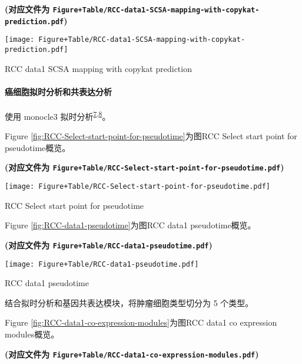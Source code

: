 \documentclass[
]{article}
\begin{document}
\textbf{(对应文件为 \texttt{Figure+Table/RCC-data1-SCSA-mapping-with-copykat-prediction.pdf})}

\def\@captype{figure}
\begin{center}
\texttt{[image: Figure+Table/RCC-data1-SCSA-mapping-with-copykat-prediction.pdf]}
\caption{RCC data1 SCSA mapping with copykat prediction}\label{fig:RCC-data1-SCSA-mapping-with-copykat-prediction}
\end{center}

\hypertarget{ux764cux7ec6ux80deux62dfux65f6ux5206ux6790ux548cux5171ux8868ux8fbeux5206ux6790}{%
\paragraph{癌细胞拟时分析和共表达分析}\label{ux764cux7ec6ux80deux62dfux65f6ux5206ux6790ux548cux5171ux8868ux8fbeux5206ux6790}}

使用 monocle3 拟时分析\textsuperscript{\protect\hyperlink{ref-ReversedGraphQiuX2017}{7},\protect\hyperlink{ref-TheDynamicsAnTrapne2014}{8}}。

Figure \ref{fig:RCC-Select-start-point-for-pseudotime}为图RCC Select start point for pseudotime概览。

\textbf{(对应文件为 \texttt{Figure+Table/RCC-Select-start-point-for-pseudotime.pdf})}

\def\@captype{figure}
\begin{center}
\texttt{[image: Figure+Table/RCC-Select-start-point-for-pseudotime.pdf]}
\caption{RCC Select start point for pseudotime}\label{fig:RCC-Select-start-point-for-pseudotime}
\end{center}

Figure \ref{fig:RCC-data1-pseudotime}为图RCC data1 pseudotime概览。

\textbf{(对应文件为 \texttt{Figure+Table/RCC-data1-pseudotime.pdf})}

\def\@captype{figure}
\begin{center}
\texttt{[image: Figure+Table/RCC-data1-pseudotime.pdf]}
\caption{RCC data1 pseudotime}\label{fig:RCC-data1-pseudotime}
\end{center}

结合拟时分析和基因共表达模块，将肿瘤细胞类型切分为 5 个类型。

Figure \ref{fig:RCC-data1-co-expression-modules}为图RCC data1 co expression modules概览。

\textbf{(对应文件为 \texttt{Figure+Table/RCC-data1-co-expression-modules.pdf})}
\end{document}
